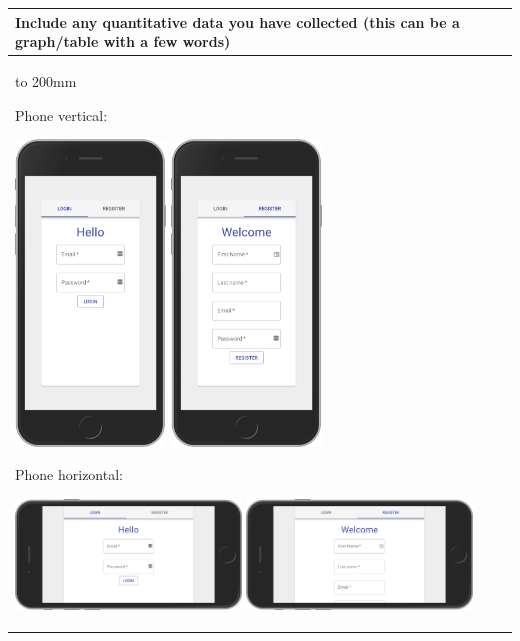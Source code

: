 \documentclass[a4paper]{article}
\newcommand{\colWidth}{141mm}
\begin{document}
\begin{center}
\begin{tabular}{|p{\colWidth}|}
	\hline
	\cellcolor{blue!25}\large
	\textbf{Include any quantitative data you have collected (this can be a graph/table with a few words)}
	\\ \hline
	\vtop to 200mm{
	\vspace{2mm}
	
Phone vertical:

 \includegraphics[width=4cm]{phone_v_login.png}
 \includegraphics[width=4cm]{phone_v_register.png}
 

Phone horizontal:

 \includegraphics[width=6cm]{phone_h_login.png}
 \includegraphics[width=6cm]{phone_h_register.png}

}
\end{tabular}
\end{center}
\end{document}
